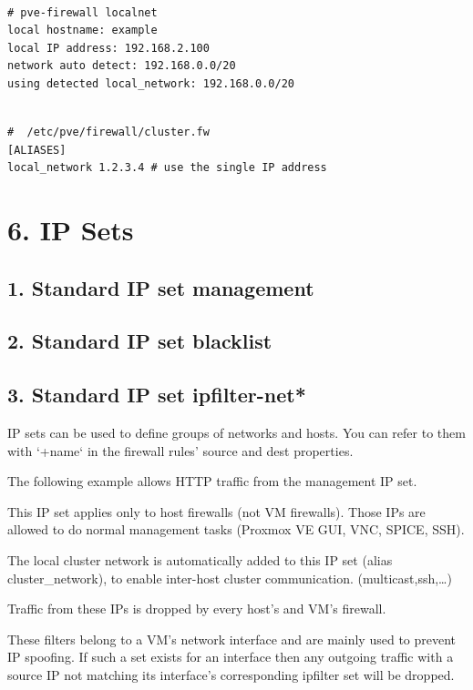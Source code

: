 \begin{lstlisting}

# pve-firewall localnet
local hostname: example
local IP address: 192.168.2.100
network auto detect: 192.168.0.0/20
using detected local_network: 192.168.0.0/20

\end{lstlisting}

\begin{lstlisting}

#  /etc/pve/firewall/cluster.fw
[ALIASES]
local_network 1.2.3.4 # use the single IP address

\end{lstlisting}


\section{6. IP Sets}

\subsection{1. Standard IP set management}

\subsection{2. Standard IP set blacklist}

\subsection{3. Standard IP set ipfilter-net*}

IP sets can be used to define groups of networks and hosts. You can refer to them with ‘+name` in the firewall rules’ source and dest properties.

The following example allows HTTP traffic from the management IP set.

This IP set applies only to host firewalls (not VM firewalls). Those IPs are allowed to do normal management tasks (Proxmox VE GUI, VNC, SPICE, SSH).

The local cluster network is automatically added to this IP set (alias cluster_network), to enable inter-host cluster communication. (multicast,ssh,…)

Traffic from these IPs is dropped by every host’s and VM’s firewall.

These filters belong to a VM’s network interface and are mainly used to prevent IP spoofing. If such a set exists for an interface then any outgoing traffic with a source IP not matching its interface’s corresponding ipfilter set will be dropped.

